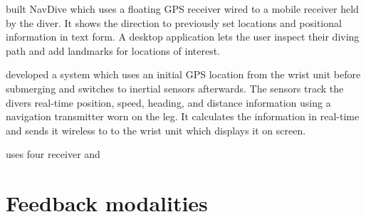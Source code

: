 \cite{Nehowig} built NavDive which uses a floating GPS receiver wired to a mobile receiver held by the diver. 
It shows the direction to previously set locations and positional information in text form. 
A desktop application lets the user inspect their diving path and add landmarks for locations of interest.

\cite{ariadna} developed a system which uses an initial GPS location from the wrist unit before submerging and switches to  inertial sensors afterwards.
The sensors track the divers real-time position, speed, heading, and distance information using a navigation transmitter worn on the leg.
It calculates the information in real-time and sends it wireless to to the wrist unit which displays it on screen.


\cite{waterlinked} uses four receiver and 

\section{Feedback modalities}

